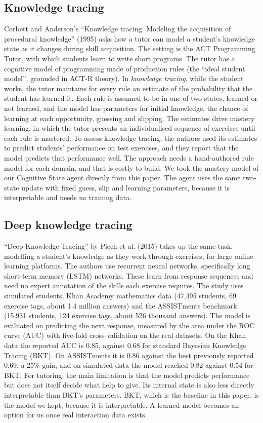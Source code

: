 \subsection{Knowledge tracing}
Corbett and Anderson's ``Knowledge tracing: Modeling the acquisition of procedural knowledge'' (1995) \cite{corbett1995} asks how a tutor can model a student's knowledge state as it changes during skill acquisition. The setting is the ACT Programming Tutor, with which students learn to write short programs. The tutor has a cognitive model of programming made of production rules (the ``ideal student model'', grounded in ACT-R theory). In \emph{knowledge tracing}, while the student works, the tutor maintains for every rule an estimate of the probability that the student has learned it. Each rule is assumed to be in one of two states, learned or not learned, and the model has parameters for initial knowledge, the chance of learning at each opportunity, guessing and slipping. The estimates drive mastery learning, in which the tutor presents an individualised sequence of exercises until each rule is mastered. To assess knowledge tracing, the authors used its estimates to predict students' performance on test exercises, and they report that the model predicts that performance well. The approach needs a hand-authored rule model for each domain, and that is costly to build. We took the mastery model of our Cognitive State agent directly from this paper. The agent uses the same two-state update with fixed guess, slip and learning parameters, because it is interpretable and needs no training data.

\subsection{Deep knowledge tracing}
``Deep Knowledge Tracing'' by Piech et al. (2015) \cite{piech2015} takes up the same task, modelling a student's knowledge as they work through exercises, for large online learning platforms. The authors use recurrent neural networks, specifically long short-term memory (LSTM) networks. These learn from response sequences and need no expert annotation of the skills each exercise requires. The study uses simulated students, Khan Academy mathematics data (47,495 students, 69 exercise tags, about 1.4 million answers) and the ASSISTments benchmark (15,931 students, 124 exercise tags, about 526 thousand answers). The model is evaluated on predicting the next response, measured by the area under the ROC curve (AUC) with five-fold cross-validation on the real datasets. On the Khan data the reported AUC is 0.85, against 0.68 for standard Bayesian Knowledge Tracing (BKT). On ASSISTments it is 0.86 against the best previously reported 0.69, a 25\% gain, and on simulated data the model reached 0.82 against 0.54 for BKT. For tutoring, the main limitation is that the model predicts performance but does not itself decide what help to give. Its internal state is also less directly interpretable than BKT's parameters. BKT, which is the baseline in this paper, is the model we kept, because it is interpretable. A learned model becomes an option for us once real interaction data exists.

